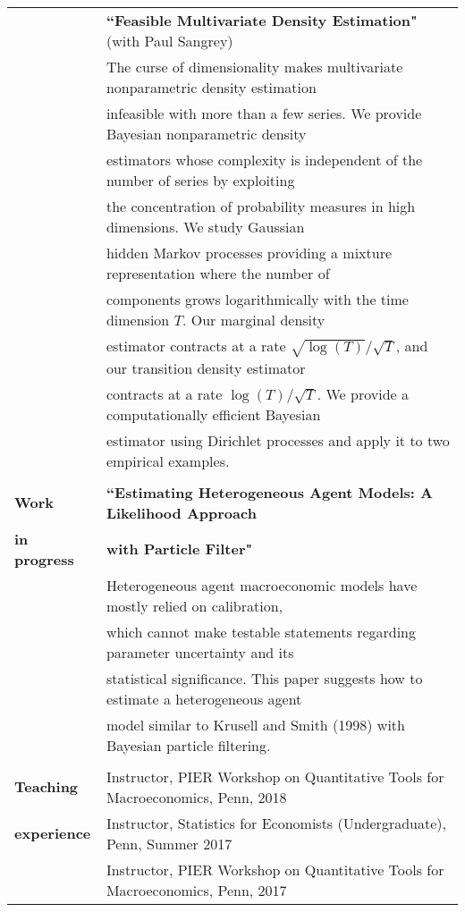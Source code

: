 \documentclass[letterpaper,11pt,oneside]{article}
\begin{document}
\noindent \begin{tabular}{@{} l l}
 & \textbf{``Feasible Multivariate Density Estimation"} (with Paul Sangrey)\\[0.05in]
 & The curse of dimensionality makes multivariate nonparametric density estimation\\
 & infeasible with more than a few series. We provide Bayesian nonparametric density\\
 & estimators whose complexity is independent of the number of series by exploiting\\
 & the concentration of probability measures in high dimensions. We study Gaussian\\
 & hidden Markov processes providing a mixture representation where the number of\\
 & components grows logarithmically with the time dimension $T$. Our marginal density\\
 &estimator contracts at a rate $\sqrt{\log(T)}/\sqrt{T}$, and our transition density estimator\\
 & contracts at a rate $\log(T)/\sqrt{T}$. We provide a computationally efficient Bayesian\\
 & estimator using Dirichlet processes and apply it to two empirical examples.\\[0.1in]
    & \\
 \large{\textbf{Work}}  & \textbf{``Estimating Heterogeneous Agent Models:
A Likelihood Approach}\\
 \large{\textbf{in progress}}& \textbf{with Particle Filter"}\\[0.05in]
& Heterogeneous agent macroeconomic models have mostly relied on calibration,\\
&which cannot make testable statements regarding
parameter uncertainty and its \\
&statistical significance. This paper suggests how to estimate a
heterogeneous agent\\
& model similar to Krusell and Smith (1998) with Bayesian
particle filtering.\\
     \vspace{0.1in} \\
  \large{\textbf{Teaching}}    &  Instructor, PIER Workshop on Quantitative Tools for Macroeconomics, Penn, 2018\\ 
  \large{\textbf{experience}} &   Instructor, Statistics for Economists (Undergraduate), Penn, Summer 2017\\
& Instructor, PIER Workshop on Quantitative Tools for Macroeconomics, Penn, 2017\\%

\end{tabular}
\end{document}
